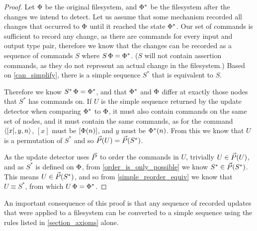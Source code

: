 \begin{proof}
Let $\Phi$ be the original filesystem, and $\Phi^*$
be the filesystem after the changes we intend to detect.
Let us assume that some mechanism recorded all changes that occurred
to $\Phi$ until it reached the state $\Phi^*$.
Our set of commands is sufficient to record any change, as
there are commands for every input and output type pair, therefore
we know that the changes can be recorded as a sequence of commands $S$
where $S\,\Phi=\Phi^*$.
($S$ will not contain assertion commands, as they do not
represent an actual change in the filesystem.)
Based on \cref{can_simplify}, there is a simple sequence $S^*$
that is equivalent to $S$.

Therefore we know $S^*\,\Phi=\Phi^*$, and that
$\Phi^*$ and $\Phi$ differ at exactly those nodes that $S^*$ has commands on.
If $U$ is the simple sequence returned by the update detector
when comparing $\Phi^*$ to $\Phi$, it must also contain commands on the same set of nodes,
and it must contain the same commands,
as for the command $\langle{[x],y,n}\rangle$, $[x]$ must be $[\Phi(n)]$, and $y$ must be $\Phi^*(n)$.
From this we know that $U$ is a permutation of $S^*$ and so $\vec{P}({U})=\vec{P}({S^*})$.

As the update detector uses $\vec{P}$ to order the commands in $U$, trivially $U\in\vec{P}({U})$, %
and as $S^*$ is defined on $\Phi$,
from \cref{order_is_only_possible} we know $S^* \in \vec{P}({S^*})$.
This means $U\in\vec{P}({S^*})$,
and so from \cref{simple_reorder_equiv} we know that $U\equiv S^*$,
from which $U\,\Phi=\Phi^*$.
\end{proof}

An important consequence of this proof is that any sequence
of recorded updates that were applied to a filesystem can be
converted to a simple sequence using the rules listed in
\cref{section_axioms} alone.
